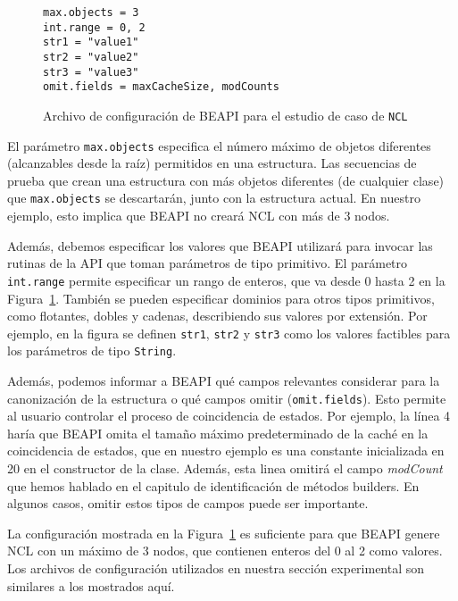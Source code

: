 \begin{figure}[h!]
    \centering
    \begin{verbatim}
max.objects = 3
int.range = 0, 2
str1 = "value1"
str2 = "value2"
str3 = "value3"
omit.fields = maxCacheSize, modCounts
    \end{verbatim}
    \caption{Archivo de configuración de \textsf{BEAPI} para el estudio de caso de \texttt{NCL}}
    \label{fig:NCL-fin-BEAPI}
\end{figure}

El parámetro \texttt{max.objects} especifica el número máximo de objetos diferentes (alcanzables desde la raíz) permitidos en una estructura. Las secuencias de prueba que crean una estructura con más objetos diferentes (de cualquier clase) que \texttt{max.objects} se descartarán, junto con la estructura actual. En nuestro ejemplo, esto implica que \textsf{BEAPI} no creará NCL con más de 3 nodos.

Además, debemos especificar los valores que \textsf{BEAPI} utilizará para invocar las rutinas de la API que toman parámetros de tipo primitivo. El parámetro \texttt{int.range} permite especificar un rango de enteros, que va desde 0 hasta 2 en la Figura~\ref{fig:NCL-fin-BEAPI}. También se pueden especificar dominios para otros tipos primitivos, como flotantes, dobles y cadenas, describiendo sus valores por extensión. Por ejemplo, en la figura se definen \texttt{str1}, \texttt{str2} y \texttt{str3} como los valores factibles para los parámetros de tipo \texttt{String}.

Además, podemos informar a \textsf{BEAPI} qué campos relevantes considerar para la canonización de la estructura o qué campos omitir (\texttt{omit.fields}). Esto permite al usuario controlar el proceso de coincidencia de estados. Por ejemplo,  la línea 4 haría que \textsf{BEAPI} omita el tamaño máximo predeterminado de la caché en la coincidencia de estados, que en nuestro ejemplo es una constante inicializada en 20 en el constructor de la clase. Además, esta linea omitirá el campo \emph{modCount} que hemos hablado en el capitulo de identificación de métodos builders. En algunos casos, omitir estos tipos de campos puede ser importante.

La configuración mostrada en la Figura~\ref{fig:NCL-fin-BEAPI} es suficiente para que \textsf{BEAPI} genere NCL con un máximo de 3 nodos, que contienen enteros del 0 al 2 como valores. Los archivos de configuración utilizados en nuestra sección experimental son similares a los mostrados aquí.


